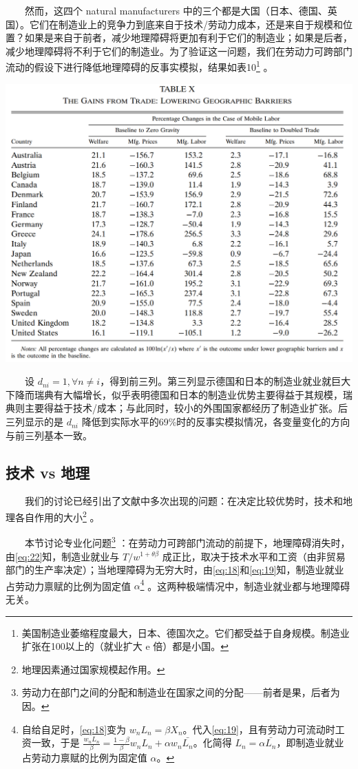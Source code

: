 \documentclass[]{article}
\let\rmarkdownfootnote\footnote%
\def\footnote{\protect\rmarkdownfootnote}
\begin{document}
　　然而，这四个 natural manufacturers 中的三个都是大国（日本、德国、英国）。它们在制造业上的竞争力到底来自于技术/劳动力成本，还是来自于规模和位置？如果是来自于前者，减少地理障碍将更加有利于它们的制造业；如果是后者，减少地理障碍将不利于它们的制造业。为了验证这一问题，我们在劳动力可跨部门流动的假设下进行降低地理障碍的反事实模拟，结果如表10\footnote{美国制造业萎缩程度最大，日本、德国次之。它们都受益于自身规模。制造业扩张在100以上的（就业扩大 e 倍）都是小国。} 。

\begin{center}\includegraphics[width=1\linewidth]{Figures/Table10} \end{center}

　　设 \(d_{n i}=1, \forall n \neq i\)，得到前三列。第三列显示德国和日本的制造业就业就巨大下降而瑞典有大幅增长，似乎表明德国和日本的制造业优势主要得益于其规模，瑞典则主要得益于技术/成本；与此同时，较小的外围国家都经历了制造业扩张。后三列显示的是 \(d_{n i}\) 降低到实际水平的69\%时的反事实模拟情况，各变量变化的方向与前三列基本一致。

\hypertarget{vs-}{%
\subsection{技术 vs 地理}\label{vs-}}

　　我们的讨论已经引出了文献中多次出现的问题：在决定比较优势时，技术和地理各自作用的大小\footnote{地理因素通过国家规模起作用。} 。

　　本节讨论专业化问题\footnote{劳动力在部门之间的分配和制造业在国家之间的分配------前者是果，后者为因。} ：在劳动力可跨部门流动的前提下，地理障碍消失时，由\eqref{eq:22}知，制造业就业与 \(T/w^{1+\theta\beta}\) 成正比，取决于技术水平和工资（由非贸易部门的生产率决定）；当地理障碍为无穷大时，由\eqref{eq:18}和\eqref{eq:19}知，制造业就业占劳动力禀赋的比例为固定值 \(\alpha\)\footnote{自给自足时，\eqref{eq:18}变为 \(w_n L_n = \beta X_n\)。代入\eqref{eq:19}，且有劳动力可流动时工资一致，于是 \(\frac{w_n L_n}{\beta} = \frac{1-\beta}{\beta}w_n L_n+\alpha w_n \bar{L_n}\)。化简得 \(L_n = \alpha \bar{L_n}\)，即制造业就业占劳动力禀赋的比例为固定值 \(\alpha\)。} 。这两种极端情况中，制造业就业都与地理障碍无关。
\end{document}
